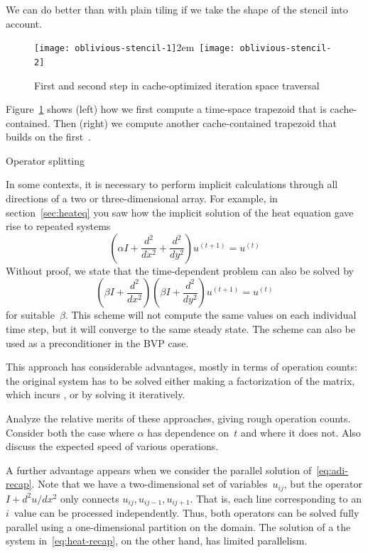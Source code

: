 We can do better than with plain tiling if we take the shape of the
stencil into account.
\begin{figure}[ht]
  \hbox{\texttt{[image: oblivious-stencil-1]}\kern2em\relax
    \texttt{[image: oblivious-stencil-2]}}
  \caption{First and second step in cache-optimized iteration space
    traversal}
  \label{fig:oblivious-cache}
\end{figure}
Figure~\ref{fig:oblivious-cache} shows (left) how we first compute a
time-space trapezoid that is cache-contained. Then (right) we compute
another cache-contained trapezoid that builds on the
first~\cite{Frigo:2007:oblivious-stencil}.

 {Operator splitting}

In some contexts, it is necessary to perform implicit calculations
through all directions of a two or three-dimensional array. For
example, in section~\ref{sec:heateq} you saw how the implicit solution
of the heat equation
gave rise to repeated systems
\begin{equation}
  (\alpha I+\frac {d^2}{dx^2}+\frac{d^2}{dy^2})u^{(t+1)}=u^{(t)}
  \label{eq:heat-recap}
\end{equation}
Without proof, we state that the time-dependent problem can also be solved by
\begin{equation}
  (\beta I+\frac {d^2}{dx^2})(\beta I+\frac{d^2}{dy^2})u^{(t+1)}=u^{(t)}
  \label{eq:adi-recap}
\end{equation}
for suitable~$\beta$. This scheme will not compute the same
values on each individual time step, but it will converge to the same
steady state. The scheme can also be used as a preconditioner in the
\ac{BVP} case.

This approach has considerable advantages, mostly in terms of
operation counts: the original system has to be solved either making a
factorization of the matrix, which incurs , or by
solving it iteratively.

\begin{exercise}
  Analyze the relative merits of these approaches, giving rough
  operation counts. Consider both the case where $\alpha$ has
  dependence on~$t$ and where it does not. Also discuss the expected
  speed of various operations.
\end{exercise}

A further advantage appears when we consider the parallel solution
of~\eqref{eq:adi-recap}. Note that we have a two-dimensional set of
variables~$u_{ij}$, but the operator $I+d^2u/dx^2$ only connects
$u_{ij},u_{ij-1},u_{ij+1}$. That is, each line corresponding to an
$i$~value can be processed independently. Thus, both operators can be
solved fully parallel using a one-dimensional partition on the domain.
The solution of a the system in~\eqref{eq:heat-recap}, on the other
hand, has limited parallelism.

